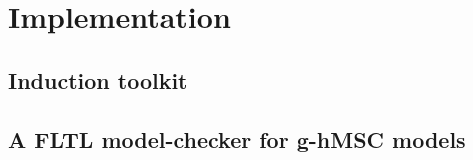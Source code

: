 \chapter{Implementation}

\section{Induction toolkit}

\section{A FLTL model-checker for g-hMSC models}
